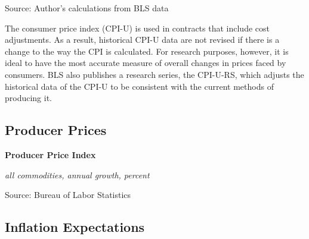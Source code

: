 \documentclass{report}
\makeatletter
\newcommand{\tbllink}[1]{\href{https://raw.githubusercontent.com/bdecon/US-chartbook/master/chartbook/data/#1}{\faTable}}
\newcommand*\short[1]{\expandafter\@gobbletwo\number\numexpr#1\relax}
\newcommand{\dateaxisticks}{
		date coordinates in=x, axis line style={draw=none},
		xmax={2020-08-10},
		max space between ticks=40,	    
		xtick={{1990-01-01}, {1992-01-01}, {1994-01-01}, 
			{1996-01-01}, {1998-01-01}, {2000-01-01}, 
			{2002-01-01}, {2004-01-01}, {2006-01-01},
			{2008-01-01}, {2010-01-01}, {2012-01-01}, {2014-01-01},
		    {2016-01-01}, {2018-01-01}, {2020-01-01}},
		minor xtick={{1989-01-01}, {1991-01-01}, {1993-01-01},
			{1995-01-01}, {1997-01-01}, {1999-01-01}, 
			{2001-01-01}, {2003-01-01}, {2005-01-01}, {2007-01-01},
		    {2009-01-01}, {2011-01-01}, {2013-01-01}, {2015-01-01},
		    {2017-01-01}, {2019-01-01}},
		enlarge y limits={0.06}, enlarge x limits={0.01},
		}
\newcommand{\bbar}[2]{extra #1 ticks = {{#2}}, extra #1 tick labels = ,
		extra #1 tick style = {grid=major, grid style={thick, black!25}},}
\newcommand{\stdline}[4]{\addplot[very thick, no markers, color=#1] 
		table [x=#2, y=#3, col sep=comma] {#4};	}
\newcommand{\rbars}{
		\fill[color=black!10] (axis cs:{1990-07-01},\pgfkeysvalueof{/pgfplots/ymin}) rectangle 
			(axis cs:{1991-03-01}, \pgfkeysvalueof{/pgfplots/ymax});
		\fill[color=black!10] (axis cs:{2007-12-01},\pgfkeysvalueof{/pgfplots/ymin}) rectangle 
			(axis cs:{2009-07-01}, \pgfkeysvalueof{/pgfplots/ymax});
		\fill[color=black!10] (axis cs:{2001-03-01},\pgfkeysvalueof{/pgfplots/ymin}) rectangle 
			(axis cs:{2001-11-01}, \pgfkeysvalueof{/pgfplots/ymax});
		\fill[color=black!10] (axis cs:{2020-02-01},\pgfkeysvalueof{/pgfplots/ymin}) rectangle 
			(axis cs:{2020-09-01}, \pgfkeysvalueof{/pgfplots/ymax});}
\makeatother
\begin{document}
{{{{{{{{{\begin{minipage}{0.76\textwidth}
\footnotesize{Source: Author's calculations from BLS data} \hspace{32mm} \tbllink{cpi_decomp.csv}

\vspace{8mm}


\small The consumer price index (CPI-U) is used in contracts that include cost adjustments. As a result, historical CPI-U data are not revised if there is a change to the way the CPI is calculated. For research purposes, however, it is ideal to have the most accurate measure of overall changes in prices faced by consumers. BLS also publishes a research series, the CPI-U-RS, which adjusts the historical data of the CPI-U to be consistent with the current methods of producing it. 
\end{minipage}

\newpage

\subsection*{\color{black!70} \seriffont Producer Prices}

\begin{minipage}{0.47\textwidth}
\normalsize \textbf{Producer Price Index}

\footnotesize{\textit{all commodities, annual growth, percent}}

\hspace*{-2mm} 

\footnotesize{Source: Bureau of Labor Statistics} \hfill \tbllink{ppi.csv}
\end{minipage} \hspace{6mm} 
\begin{minipage}{0.24\textwidth}
\small 
\end{minipage}

\subsection*{\color{black!70} \seriffont Inflation Expectations}

}}}}}}}}}
\end{document}

